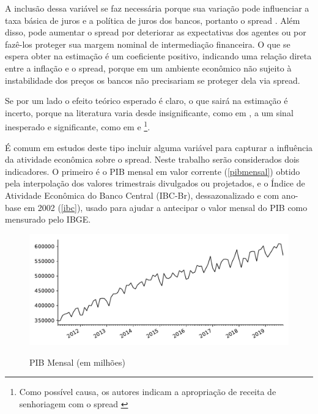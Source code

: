 \documentclass[a4paper,
               article,
               12pt,
               openany,
               oneside,
               english,
               brazil]{abntex2}
\numberwithin{equation}{section}
\begin{document}
    A inclusão dessa variável se faz necessária porque sua variação pode influenciar a taxa básica de juros e a política de juros dos bancos, portanto o spread \cite[p.~14]{bignotto06}. Além disso, pode aumentar o spread por deteriorar as expectativas dos agentes ou por fazê-los proteger sua margem nominal de intermediação financeira. O que se espera obter na estimação é um coeficiente positivo, indicando uma relação direta entre a inflação e o spread, porque em um ambiente econômico não sujeito à instabilidade dos preços os bancos não precisariam se proteger dela via spread. 
    
    Se por um lado o efeito teórico esperado é claro, o que sairá na estimação é incerto, porque na literatura varia desde insignificante, como em \textcite{oreiro}, a um sinal inesperado e significante, como em \textcite{bignotto06} e \textcite{afanasieff02}\footnote{Como possível causa, os autores indicam a apropriação de receita de senhoriagem com o spread \cite[p.~25]{afanasieff02}}.
    
    É comum em estudos deste tipo incluir alguma variável para capturar a influência da atividade econômica sobre o spread. Neste trabalho serão considerados dois indicadores. O primeiro é o PIB mensal em valor corrente (\autoref{pibmensal}) obtido pela interpolação dos valores trimestrais divulgados ou projetados, e o Índice de Atividade Econômica do Banco Central (IBC-Br), dessazonalizado e com ano-base em 2002 (\autoref{ibc}), usado para ajudar a antecipar o valor mensal do PIB como mensurado pelo IBGE.

    \begin{figure}[!hbt]
        \centering
        \caption{PIB Mensal (em milhões)}
        \includegraphics[width = \textwidth, scale=0.75]{pib_mensal.pdf}
        \label{pibmensal}
    \end{figure}
\end{document}
